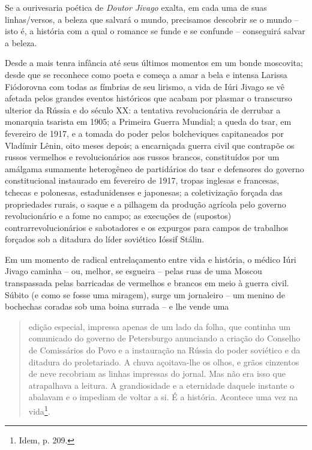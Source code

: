 Se a ourivesaria poética de \emph{Doutor Jivago} exalta, em cada uma de
suas linhas/versos, a beleza que salvará o mundo, precisamos descobrir
se o mundo -- isto é, a história com a qual o romance se funde e se
confunde -- conseguirá salvar a beleza.

Desde a mais tenra infância até seus últimos momentos em um bonde
moscovita; desde que se reconhece como poeta e começa a amar a bela e
intensa Larissa Fiódorovna com todas as fímbrias de seu lirismo, a vida
de Iúri Jivago se vê afetada pelos grandes eventos históricos que acabam
por plasmar o transcurso ulterior da Rússia e do século XX: a tentativa
revolucionária de derrubar a monarquia tsarista em 1905; a Primeira
Guerra Mundial; a queda do tsar, em fevereiro de 1917, e a tomada do
poder pelos bolcheviques capitaneados por Vladímir Lênin, oito meses
depois; a encarniçada guerra civil que contrapõe os russos vermelhos e
revolucionários aos russos brancos, constituídos por um amálgama
sumamente heterogêneo de partidários do tsar e defensores do governo
constitucional instaurado em fevereiro de 1917, tropas inglesas e
francesas, tchecas e polonesas, estadunidenses e japonesas; a
coletivização forçada das propriedades rurais, o saque e a pilhagem da
produção agrícola pelo governo revolucionário e a fome no campo; as
execuções de (supostos) contrarrevolucionários e sabotadores e os
expurgos para campos de trabalhos forçados sob a ditadura do líder
soviético Ióssif Stálin.

Em um momento de radical entrelaçamento entre vida e história, o médico
Iúri Jivago caminha -- ou, melhor, se esgueira -- pelas ruas de uma
Moscou transpassada pelas barricadas de vermelhos e brancos em meio à
guerra civil. Súbito (e como se fosse uma miragem), surge um jornaleiro
-- um menino de bochechas coradas sob uma boina surrada -- e lhe vende
uma

\begin{quote}
edição especial, impressa apenas de um lado da folha, que continha um
comunicado do governo de Petersburgo anunciando a criação do Conselho de
Comissários do Povo e a instauração na Rússia do poder soviético e da
ditadura do proletariado. A chuva açoitava-lhe os olhos, e grãos
cinzentos de neve recobriam as linhas impressas do jornal. Mas não era
isso que atrapalhava a leitura. A grandiosidade e a eternidade daquele
instante o abalavam e o impediam de voltar a si. É a história. Acontece
uma vez na vida\footnote{Idem, p. 209.}.
\end{quote}

